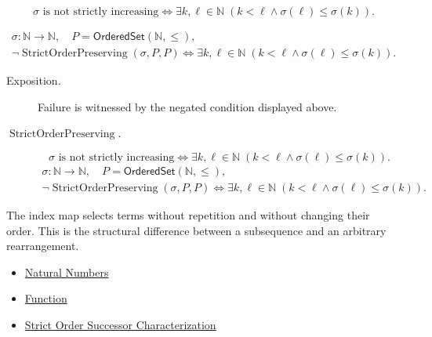 \begin{remark*}
\[
\sigma\text{ is not strictly increasing}
\Longleftrightarrow
\exists k,\ell\in\mathbb{N}\;(k<\ell\land \sigma(\ell)\le \sigma(k)).
\]
\end{remark*}

\begin{remark*}
\[
\begin{gathered}
\sigma\colon\mathbb{N}\to\mathbb{N},\quad
P=\mathsf{OrderedSet}(\mathbb{N},\leq),\\
\neg\operatorname{StrictOrderPreserving}(\sigma,P,P)
\Longleftrightarrow
\exists k,\ell\in\mathbb{N}\;(k<\ell\land \sigma(\ell)\le \sigma(k)).
\end{gathered}
\]
\end{remark*}
\begin{remark*}
\begin{description}
  \item[Exposition.]
Failure is witnessed by the negated condition displayed above.
  \item[\(\operatorname{StrictOrderPreserving}.\)]
\[
\sigma\text{ is not strictly increasing}
\Longleftrightarrow
\exists k,\ell\in\mathbb{N}\;(k<\ell\land \sigma(\ell)\le \sigma(k)).
\]
\[
\begin{gathered}
\sigma\colon\mathbb{N}\to\mathbb{N},\quad
P=\mathsf{OrderedSet}(\mathbb{N},\leq),\\
\neg\operatorname{StrictOrderPreserving}(\sigma,P,P)
\Longleftrightarrow
\exists k,\ell\in\mathbb{N}\;(k<\ell\land \sigma(\ell)\le \sigma(k)).
\end{gathered}
\]
\end{description}
\end{remark*}

\begin{remark*}[Interpretation]
The index map selects terms without repetition and without changing their
order. This is the structural difference between a subsequence and an
arbitrary rearrangement.
\end{remark*}

\begin{dependencies}
\begin{itemize}
  \item \hyperref[def:natural-numbers]{Natural Numbers}
  \item \hyperref[def:function]{Function}
  \item \hyperref[thm:strict-order-successor-characterization]{Strict Order Successor Characterization}
\end{itemize}
\end{dependencies}

